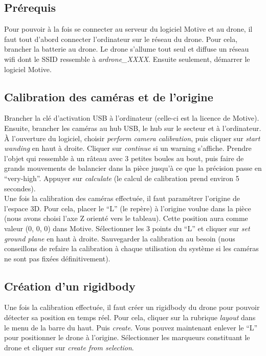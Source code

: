         \subsection{Prérequis}
            Pour pouvoir à la fois se connecter au serveur du logiciel Motive et au drone, il faut tout d'abord connecter l'ordinateur sur le réseau du drone. Pour cela, brancher la batterie au drone. Le drone s'allume tout seul et diffuse un réseau wifi dont le SSID ressemble à \textit{ardrone\_XXXX}. Ensuite seulement, démarrer le logiciel Motive.

        \subsection{Calibration des caméras et de l'origine}
            Brancher la clé d'activation USB à l'ordinateur (celle-ci est la licence de Motive). Ensuite, brancher les caméras au hub USB, le hub sur le secteur et à l'ordinateur. À l'ouverture du logiciel, choisir \emph{perform camera calibration}, puis cliquer sur \emph{start wanding} en haut à droite. Cliquer sur \emph{continue} si un warning s'affiche. Prendre l'objet qui ressemble à un râteau avec 3 petites boules au bout, puis faire de grands mouvements de balancier dans la pièce jusqu'à ce que la précision passe en ``very-high''. Appuyer sur \emph{calculate} (le calcul de calibration prend environ 5 secondes). \\

            Une fois la calibration des caméras effectuée, il faut paramétrer l'origine de l'espace 3D. Pour cela, placer le ``L'' (le repère) à l'origine voulue dans la pièce (nous avons choisi l'axe Z orienté vers le tableau). Cette position aura comme valeur (0, 0, 0) dans Motive. Sélectionner les 3 points du ``L'' et cliquer sur \emph{set ground plane} en haut à droite. Sauvegarder la calibration au besoin (nous conseillons de refaire la calibration à chaque utilisation du système si les caméras ne sont pas fixées définitivement).

        \subsection{Création d'un rigidbody}
            Une fois la calibration effectuée, il faut créer un rigidbody du drone pour pouvoir détecter sa position en temps réel. Pour cela, cliquer sur la rubrique \emph{layout} dans le menu de la barre du haut. Puis \emph{create}. Vous pouvez maintenant enlever le ``L'' pour positionner le drone à l'origine. Sélectionner les marqueurs constituant le drone et cliquer sur \emph{create from selection}.

